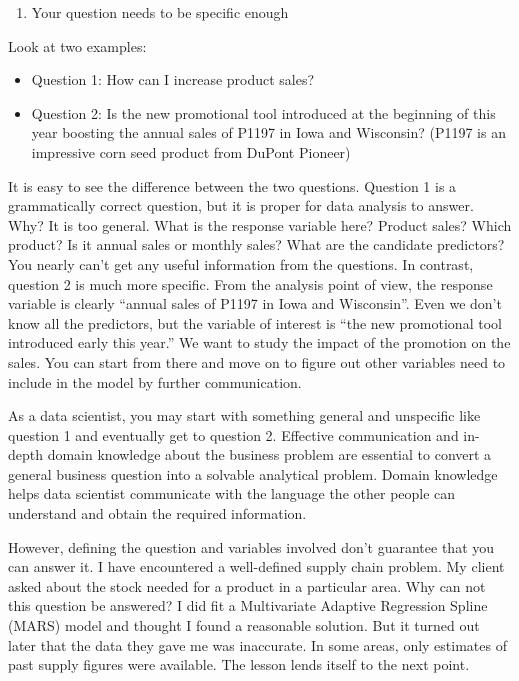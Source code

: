 \documentclass[]{book}
\providecommand{\tightlist}{%
  \setlength{\itemsep}{0pt}\setlength{\parskip}{0pt}}
\theoremstyle{definition}
\theoremstyle{definition}
\theoremstyle{remark}
\begin{document}
\begin{enumerate}
\def\labelenumi{\arabic{enumi}.}
\tightlist
\item
  Your question needs to be specific enough
\end{enumerate}

Look at two examples:

\begin{itemize}
\tightlist
\item
  Question 1: How can I increase product sales?
\item
  Question 2: Is the new promotional tool introduced at the beginning of
  this year boosting the annual sales of P1197 in Iowa and Wisconsin?
  (P1197 is an impressive corn seed product from DuPont Pioneer)
\end{itemize}

It is easy to see the difference between the two questions. Question 1
is a grammatically correct question, but it is proper for data analysis
to answer. Why? It is too general. What is the response variable here?
Product sales? Which product? Is it annual sales or monthly sales? What
are the candidate predictors? You nearly can't get any useful
information from the questions. In contrast, question 2 is much more
specific. From the analysis point of view, the response variable is
clearly ``annual sales of P1197 in Iowa and Wisconsin''. Even we don't
know all the predictors, but the variable of interest is ``the new
promotional tool introduced early this year.'' We want to study the
impact of the promotion on the sales. You can start from there and move
on to figure out other variables need to include in the model by further
communication.

As a data scientist, you may start with something general and unspecific
like question 1 and eventually get to question 2. Effective
communication and in-depth domain knowledge about the business problem
are essential to convert a general business question into a solvable
analytical problem. Domain knowledge helps data scientist communicate
with the language the other people can understand and obtain the
required information.

However, defining the question and variables involved don't guarantee
that you can answer it. I have encountered a well-defined supply chain
problem. My client asked about the stock needed for a product in a
particular area. Why can not this question be answered? I did fit a
Multivariate Adaptive Regression Spline (MARS) model and thought I found
a reasonable solution. But it turned out later that the data they gave
me was inaccurate. In some areas, only estimates of past supply figures
were available. The lesson lends itself to the next point.
\end{document}
